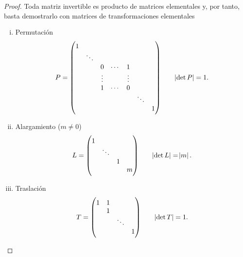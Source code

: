 \begin{proof}
    Toda matriz invertible es producto de matrices elementales y, por tanto, basta demostrarlo con matrices de transformaciones elementales
    \begin{enumerate}[i)]
        \item Permutación
            \[
                P = 
                \begin{pmatrix}
                    1 \\
                    & \ddots \\
                    & & 0 & \cdots & 1 \\
                    & & \vdots & & \vdots \\
                    & & 1 & \cdots & 0 \\
                    & & & & & \ddots \\
                    & & & & & & 1
                \end{pmatrix}
                \qquad \abs{\det P} = 1.
            \]
        \item Alargamiento ($m \neq 0$)
            \[
                L =
                \begin{pmatrix}
                    1 \\
                    & \ddots \\
                    & & 1 \\
                    & & & m
                \end{pmatrix}
                \qquad \abs{\det L } = \abs{m}.
            \]
        \item Traslación
            \[
                T =
                \begin{pmatrix}
                    1 & 1 \\
                    & 1 \\
                    & & \ddots \\
                    & & & 1
                \end{pmatrix}
                \qquad \abs{\det T} = 1.
            \]
    \end{enumerate}


\end{proof}
